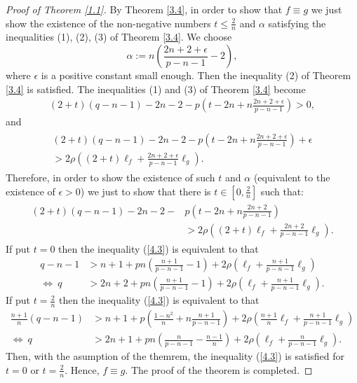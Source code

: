 \documentclass[10pt,a4paper]{amsart}
\begin{document}
\begin{proof}[Proof of Theorem \ref{1.1}] By Theorem \ref{3.4}, in order to show that $f\equiv g$ we just show the existence of the non-negative numbers $t\le\frac{2}{n}$ and $\alpha$ satisfying the inequalities (1), (2), (3) of Theorem \ref{3.4}. We choose
$$ \alpha:=n\left(\frac{2n+2+\epsilon}{p-n-1}-2\right),$$
where $\epsilon$ is a positive constant small enough. Then the inequality (2) of Theorem \ref{3.4} is satisfied. The inequalities (1) and (3) of Theorem \ref{3.4} become
\begin{align}\label{4.1}
(2+t)(q-n-1)-2n-2-p\left(t-2n+n\frac{2n+2+\epsilon}{p-n-1}\right)> 0,
\end{align}
and
\begin{align}
\label{4.2}
\begin{split}
(2+t)(q-n-1)-2n-2-p\left(t-2n+n\frac{2n+2+\epsilon}{p-n-1}\right)+\epsilon\\
>2\rho\left((2+t)\ell_f+\frac{2n+2+\epsilon}{p-n-1}\ell_g\right).
\end{split}
\end{align}
Therefore, in order to show the existence of such $t$ and $\alpha$ (equivalent to the existence of $\epsilon >0$) we just to show that there is $t\in[0,\frac{2}{n}]$ such that:
\begin{align}
\label{4.3}
\begin{split}
(2+t)(q-n-1)-2n-2-&p\left(t-2n+n\frac{2n+2}{p-n-1}\right)\\
&>2\rho\left((2+t)\ell_f+\frac{2n+2}{p-n-1}\ell_g\right).
\end{split}
\end{align}
If put $t=0$ then the inequality (\ref{4.3}) is equivalent to that 
\begin{align*}
q-n-1&>n+1+pn\left(\frac{n+1}{p-n-1}-1\right)+2\rho\left(\ell_f+\frac{n+1}{p-n-1}\ell_g\right)\\ 
\Leftrightarrow\ q&>2n+2+pn\left(\frac{n+1}{p-n-1}-1\right)+2\rho\left(\ell_f+\frac{n+1}{p-n-1}\ell_g\right).
\end{align*}
If put $t=\frac{2}{n}$ then the inequality (\ref{4.3}) is equivalent to that 
\begin{align*}
\frac{n+1}{n}(q-n-1)&>n+1+p\left(\frac{1-n^2}{n}+n\frac{n+1}{p-n-1}\right)+2\rho\left(\frac{n+1}{n}\ell_f+\frac{n+1}{p-n-1}\ell_g\right)\\
\Leftrightarrow\ q&>2n+1+pn\left(\frac{n}{p-n-1}-\frac{n-1}{n}\right)+2\rho\left(\ell_f+\frac{n}{p-n-1}\ell_g\right).
\end{align*}
Then, with the asumption of the themrem, the inequality (\ref{4.3}) is satisfied for $t=0$ or $t=\frac{2}{n}$. Hence, $f\equiv g$.
The proof of the theorem is completed.
\end{proof}
\end{document}
